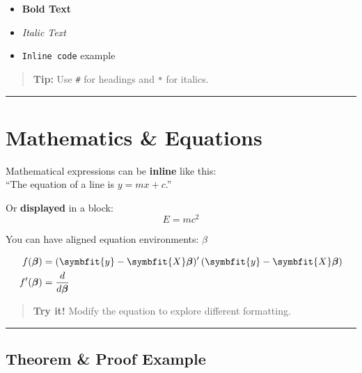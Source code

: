\documentclass[
  14pt,
  a4paper,
]{extarticle}
\renewcommand{\mathbf}[1]{\symbfit{#1}}
\providecommand{\tightlist}{%
  \setlength{\itemsep}{0pt}\setlength{\parskip}{0pt}}
\begin{document}
\begin{itemize}
\tightlist
\item
  \textbf{Bold Text}\\
\item
  \emph{Italic Text}\\
\item
  \texttt{Inline\ code} example
\end{itemize}

\begin{quote}
 \textbf{Tip:} Use \texttt{\#} for headings and
\texttt{*} for italics.
\end{quote}

\begin{center}\rule{0.5\linewidth}{0.5pt}\end{center}

\section{\texorpdfstring{ \textbf{Mathematics \&
Equations}}{ Mathematics \& Equations}}\label{mathematics-equations}

Mathematical expressions can be \textbf{inline} like this:\\
``The equation of a line is \(y = mx + c\).''

Or \textbf{displayed} in a block: \[
E = mc^2
\]

You can have aligned equation environments: \(\beta\)

\begin{align*}
f(\boldsymbol{\beta}) &= (\mathbf{y} - \mathbf{X}\boldsymbol{\beta})'\,(\mathbf{y} - \mathbf{X}\boldsymbol{\beta}) \\
f'(\boldsymbol{\beta}) &= \frac{d}{d\boldsymbol{\beta}} 
\end{align*}

\begin{quote}
 \textbf{Try it!} Modify the equation to
explore different formatting.
\end{quote}

\begin{center}\rule{0.5\linewidth}{0.5pt}\end{center}

\subsection*{\texorpdfstring{ \textbf{Theorem \& Proof
Example}}{ Theorem \& Proof Example}}\label{theorem-proof-example}
\end{document}
